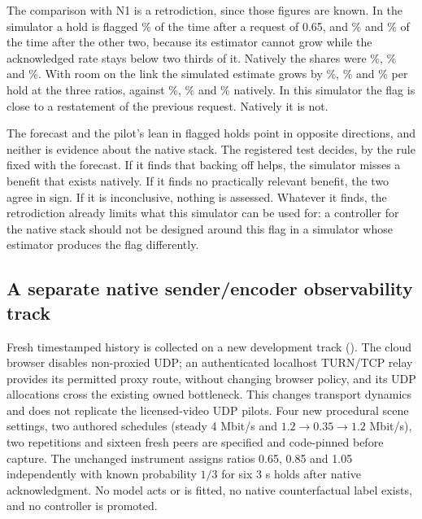 The comparison with N1 is a retrodiction, since those figures are known. In the simulator a hold is flagged \TypedCastBuiltFlagAfterLow\% of the time after a request of 0.65, and \TypedCastBuiltFlagAfterMid\% and \TypedCastBuiltFlagAfterTop\% of the time after the other two, because its estimator cannot grow while the acknowledged rate stays below two thirds of it. Natively the shares were \TypedCastNOneFlagAfterLow\%, \TypedCastNOneFlagAfterMid\% and \TypedCastNOneFlagAfterTop\%. With room on the link the simulated estimate grows by \TypedCastBuiltGrowLow\%, \TypedCastBuiltGrowMid\% and \TypedCastBuiltGrowTop\% per hold at the three ratios, against \TypedCastNOneGrowLow\%, \TypedCastNOneGrowMid\% and \TypedCastNOneGrowTop\% natively. In this simulator the flag is close to a restatement of the previous request. Natively it is not.

The forecast and the pilot's lean in flagged holds point in opposite directions, and neither is evidence about the native stack. The registered test decides, by the rule fixed with the forecast. If it finds that backing off helps, the simulator misses a benefit that exists natively. If it finds no practically relevant benefit, the two agree in sign. If it is inconclusive, nothing is assessed. Whatever it finds, the retrodiction already limits what this simulator can be used for: a controller for the native stack should not be designed around this flag in a simulator whose estimator produces the flag differently.
\fi

\subsection{A separate native sender/encoder observability track}
\label{sec:native-turn-observability}
Fresh timestamped history is collected on a new development track (). The cloud browser disables non-proxied UDP; an authenticated localhost TURN/TCP relay provides its permitted proxy route, without changing browser policy, and its UDP allocations cross the existing owned bottleneck. This changes transport dynamics and does not replicate the licensed-video UDP pilots. Four new procedural scene settings, two authored schedules (steady 4 Mbit/s and $1.2\to0.35\to1.2$ Mbit/s), two repetitions and sixteen fresh peers are specified and code-pinned before capture. The unchanged instrument assigns ratios 0.65, 0.85 and 1.05 independently with known probability $1/3$ for six 3 s holds after native acknowledgment. No model acts or is fitted, no native counterfactual label exists, and no controller is promoted.

